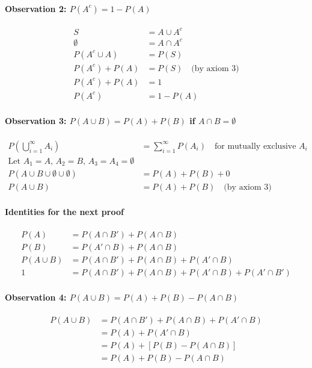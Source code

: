 \paragraph*{Observation 2: $P(A^c) = 1 - P(A)$}
\begin{align*}
    S &= A \cup A^c \\
    \emptyset &= A \cap A^c \\
    P(A^c \cup A) &= P(S) \\
    P(A^c) + P(A) &= P(S) \quad \text{(by axiom 3)} \\
    P(A^c) + P(A) &= 1 \\
    P(A^c) &= 1 - P(A)
\end{align*}

\paragraph*{Observation 3: $P(A \cup B) = P(A) + P(B)$ if $A \cap B = \emptyset$}
\begin{align*}
    P\left(\bigcup_{i=1}^\infty A_i\right) &= \sum_{i=1}^\infty P(A_i) \quad \text{for mutually exclusive } A_i \\
    \text{Let } A_1 = A,\, A_2 = B,\, A_3 = A_4 = \emptyset \\
    P(A \cup B \cup \emptyset \cup \emptyset) &= P(A) + P(B) + 0 \\
    P(A \cup B) &= P(A) + P(B) \quad \text{(by axiom 3)}
\end{align*}

\paragraph*{Identities for the next proof}
\begin{align*}
    P(A) &= P(A \cap B') + P(A \cap B) \\
    P(B) &= P(A' \cap B) + P(A \cap B) \\
    P(A \cup B) &= P(A \cap B') + P(A \cap B) + P(A' \cap B) \\
    1 &= P(A \cap B') + P(A \cap B) + P(A' \cap B) + P(A' \cap B')
\end{align*}

\paragraph*{Observation 4: $P(A \cup B) = P(A) + P(B) - P(A \cap B)$}
\begin{align*}
    P(A \cup B) &= P(A \cap B') + P(A \cap B) + P(A' \cap B) \\
    &= P(A) + P(A' \cap B) \\
    &= P(A) + [P(B) - P(A \cap B)] \\
    &= P(A) + P(B) - P(A \cap B)
\end{align*}

